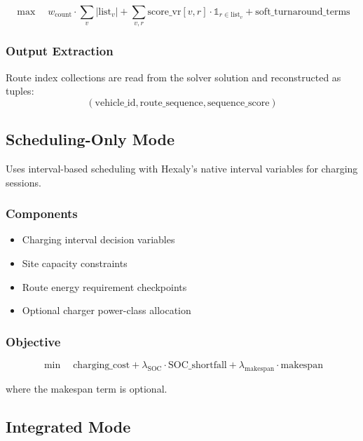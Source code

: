 \documentclass[11pt,a4paper]{article}
\begin{document}
\begin{equation}
\max \quad w_{\text{count}} \cdot \sum_v |\text{list}_v| + \sum_{v,r} \text{score\_vr}[v,r] \cdot \mathbb{1}_{r \in \text{list}_v} + \text{soft\_turnaround\_terms}
\end{equation}

\subsubsection{Output Extraction}

Route index collections are read from the solver solution and reconstructed as tuples:
\begin{equation}
(\text{vehicle\_id}, \text{route\_sequence}, \text{sequence\_score})
\end{equation}

\subsection{Scheduling-Only Mode}

Uses interval-based scheduling with Hexaly's native interval variables for charging sessions.

\subsubsection{Components}

\begin{itemize}
    \item Charging interval decision variables
    \item Site capacity constraints
    \item Route energy requirement checkpoints
    \item Optional charger power-class allocation
\end{itemize}

\subsubsection{Objective}

\begin{equation}
\min \quad \text{charging\_cost} + \lambda_{\text{SOC}} \cdot \text{SOC\_shortfall} + \lambda_{\text{makespan}} \cdot \text{makespan}
\end{equation}

where the makespan term is optional.

\subsection{Integrated Mode}
\end{document}
